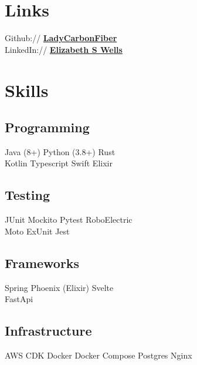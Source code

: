 \documentclass[a4paper]{deedy-resume-openfont} %
\begin{document}
\begin{minipage}[t]{0.33\textwidth}

\section{Links}

Github:// \href{https://github.com/ladycarbonfiber}{\bf LadyCarbonFiber } \\
LinkedIn:// \href{https://www.linkedin.com/in/elizabethswells/s}{\bf Elizabeth S Wells} \\




\sectionspace %


\section{Skills}

\subsection{Programming}
Java (8+) \textbullet{} Python (3.8+) \textbullet{} Rust \\
 Kotlin \textbullet{} Typescript \textbullet{} Swift \textbullet{} Elixir
\subsection {Testing}
JUnit \textbullet{} Mockito \textbullet{} Pytest \textbullet{} RoboElectric \\ Moto \textbullet{} ExUnit \textbullet{} Jest\\
\subsection {Frameworks}
Spring \textbullet{} Phoenix (Elixir) \textbullet{} Svelte\\ \textbullet{} FastApi\\
\subsection{Infrastructure}
AWS \textbullet{} CDK \textbullet{} Docker \textbullet{} Docker Compose  \textbullet{}
Postgres  \textbullet{} Nginx



\end{minipage}
\end{document}
